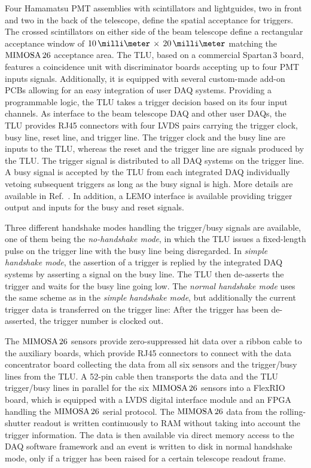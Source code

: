 Four Hamamatsu PMT assemblies with scintillators and lightguides, two in front and two in the back of the telescope, define the spatial acceptance for triggers. 
The crossed scintillators on either side of the beam telescope define a rectangular acceptance window of $10\,\milli\meter\,\times\,20\,\milli\meter$ matching the $\textrm{MIMOSA\,26}$ acceptance area. 
The TLU, based on a commercial Spartan\,3 board, features a coincidence unit with discriminator boards accepting up to four PMT inputs signals. 
Additionally, it is equipped with several custom-made add-on PCBs allowing for an easy integration of user DAQ systems. 
Providing a programmable logic, the TLU  takes a trigger decision based on its four input channels. 
As interface to the beam telescope DAQ and other user DAQs, the TLU provides RJ45 connectors with four LVDS pairs carrying the trigger clock, busy line, reset line, and trigger line. 
The trigger clock and the busy line are inputs to the TLU, whereas the reset and the trigger line are signals produced by the TLU. 
The trigger signal is distributed to all DAQ systems on the trigger line. 
A busy signal is accepted by the TLU from each integrated DAQ individually vetoing subsequent triggers as long as the busy signal is high. 
More details are available in Ref.~\cite{TLU,ref:TLUproc}.
In addition, a LEMO interface is available providing trigger output and inputs for the busy and reset signals.

Three different handshake modes handling the trigger/busy signals are available, one of them being the \textit{no-handshake mode},
 in which the TLU issues a fixed-length pulse on the trigger line with the busy line being disregarded. 
In \textit{simple handshake mode}, the assertion of a trigger is replied by the integrated DAQ systems by asserting a signal on the busy line. 
The TLU then de-asserts the trigger and waits for the busy line going low.
The \textit{normal handshake mode} uses the same scheme as in the \textit{simple handshake mode}, but additionally the current trigger data is transferred on the trigger line:
After the trigger has been de-asserted, the trigger number is clocked out. 


The $\textrm{MIMOSA\,26}$ sensors provide zero-suppressed hit data over a ribbon cable to the auxiliary boards, which provide RJ45 connectors to connect with the
 data concentrator board collecting the data from all six sensors and the trigger/busy lines from the TLU. 
A 52-pin cable then transports the data and the TLU trigger/busy lines in parallel for the six $\textrm{MIMOSA\,26}$ sensors into a FlexRIO board, which is equipped with a LVDS digital interface module
  and an FPGA handling the $\textrm{MIMOSA\,26}$ serial protocol. 
The $\textrm{MIMOSA\,26}$ data from the rolling-shutter readout is written continuously to RAM without taking into account the trigger information. 
The data is then available via direct memory access to the DAQ software framework and an event is written to disk in normal handshake mode, only if a trigger has been raised for a certain telescope readout frame. 


